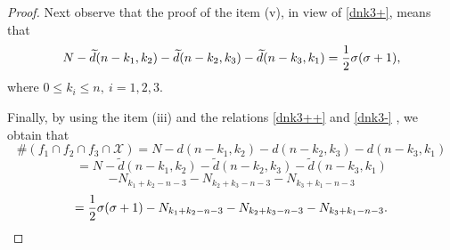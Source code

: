 \documentclass[10pt,a4paper]{amsart}
\newcommand{\Xset}{\mathcal{X}}
\begin{document}
\begin{proof}
Next observe that the proof of the item (v), in view of \eqref{dnk3+}, means that
\begin{equation}\label{dnk3-}N-\widetilde d(n-k_1, k_2)-\widetilde d(n-k_2,k_3)-\widetilde d(n-k_3,k_1)={1\over 2} \sigma(\sigma+1),\end{equation}
where $0\le k_i\le n,\ i=1,2,3.$

\noindent Finally, by using the item (iii) and the 
relations \eqref{dnk3++} and \eqref{dnk3-} , we obtain that 
$$\#(f_1\cap f_2\cap f_3 \cap \Xset)=N-d(n-k_1, k_2)- d(n-k_2,k_3)-d(n-k_3,k_1)$$ $$=N-\widetilde d(n-k_1, k_2)-\widetilde d(n-k_2,k_3)-\widetilde d(n-k_3,k_1)$$ 
$$-N_{k_1+k_2-n-3}-N_{k_2+k_3-n-3}-N_{k_3+k_1-n-3}$$
$$={1\over 2} \sigma(\sigma+1)-N_{k_1+k_2-n-3}-N_{k_2+k_3-n-3}-N_{k_3+k_1-n-3}.$$
\end{proof}
\end{document}
